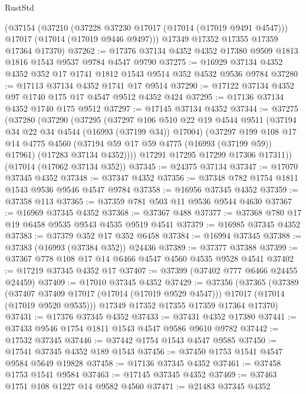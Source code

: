 \begin{lexlean}{RustStd}
\begin{coremodule}
{\begin{coremodule}
{{{{{{{{{{{{{{{{{{{{{{{{{{{{{{{{{{{{{{{{{{{{{{{{{{{{{{{    (@37154
      (@37210
        (@37228 @37230 @17017 (@17014 (@17019 @9491 @4547)))
        @17017
        (@17014 (@17019 @9446 @9497)))
      @17349
      @17352
      @17355
      @17359
      @17364
      @17370)
@37262 := @17376 @37134 @4352 @4352 @17380 @9509 @1813 @1816 @1543 @9537 @9784 @4547 @9790
@37275 := @16929 @37134 @4352 @4352 @352 @17 @1741 @1812 @1543 @9514 @352 @4532 @9536 @9784
@37280 := @17113 @37134 @4352 @1741 @17 @9514
@37290 := @17122 @37134 @4352 @97 @1740 @175 @17 @4547 @9512 @4352 @424
@37295 := @17136 @37134 @4352 @1740 @175 @9512
@37297 := @17145 @37134 @4352
@37344 := @37275
    (@37280
      (@37290
        (@37295
          (@37297
            @106
            @510
            @22
            @19
            @4544
            @9511
            (@37194 @34 @22 @34 @4544 (@16993 (@37199 @34)) @17004)
            (@37297
              @199
              @108
              @17
              @14
              @4775
              @4560
              (@37194 @59 @17 @59 @4775 (@16993 (@37199 @59)) @17961)
              (@17283 @37134 @4352))))
        @17291
        @17295
        @17299
        @17306
        @17311))
    (@17014 (@17062 @37134 @352))
@37345 := @24375 @37134
@37347 := @17070 @37345 @4352
@37348 := @37347 @4352
@37356 := @37348 @782 @1754 @1811 @1543 @9536 @9546 @4547 @9784
@37358 := @16956 @37345 @4352
@37359 := @37358 @113
@37365 := @37359 @781 @503 @11 @9536 @9544 @4630
@37367 := @16969 @37345 @4352
@37368 := @37367 @488
@37377 := @37368 @780 @17 @19 @6458 @9535 @9543 @4535 @9519 @4541
@37379 := @16985 @37345 @4352
@37383 := @37379 @352 @17 @352 @6458
@37384 := @16994 @37345
@37388 := @37383 (@16993 (@37384 @352)) @24436
@37389 := @37377 @37388
@37399 := @37367 @778 @108 @17 @14 @6466 @4547 @4560 @4535 @9528 @4541
@37402 := @17219 @37345 @4352 @17
@37407 := @37399 (@37402 @777 @6466 @24455 @24459)
@37409 := @17010 @37345 @4352
@37429 := @37356
    (@37365
      (@37389
        (@37407 @37409 @17017 (@17014 (@17019 @9529 @4547)))
        @17017
        (@17014 (@17019 @9520 @9535)))
      @17349
      @17352
      @17355
      @17359
      @17364
      @17370)
@37431 := @17376 @37345 @4352
@37433 := @37431 @4352 @17380
@37441 := @37433 @9546 @1754 @1811 @1543 @4547 @9586 @9610 @9782
@37442 := @17532 @37345
@37446 := @37442 @1754 @1543 @4547 @9585
@37450 := @17541 @37345 @4352 @189 @1543
@37456 := @37450 @1753 @1541 @4547 @9584 @5649 @19828
@37458 := @17136 @37345 @4352
@37461 := @37458 @1753 @1541 @9584
@37463 := @17145 @37345 @4352
@37469 := @37463 @1751 @108 @1227 @14 @9582 @4560
@37471 := @21483 @37345 @4352
}}}}}}}}}}}}}}}}}}}}}}}}}}}}}}}}}}}}}}}}}}}}}}}}}}}}}}}
\end{coremodule}}
\end{coremodule}
\end{lexlean}
